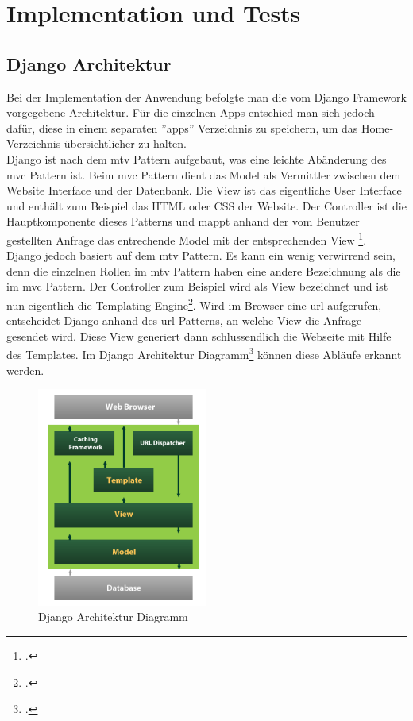 \section{Implementation und Tests}
\subsection{Django Architektur}
Bei der Implementation der Anwendung befolgte man die vom Django Framework vorgegebene Architektur. Für die einzelnen Apps entschied man sich jedoch dafür, diese in einem separaten ''apps'' Verzeichnis zu speichern, um das Home-Verzeichnis übersichtlicher zu halten.\\

Django ist nach dem \gls{mtv} Pattern aufgebaut, was eine leichte Abänderung des \gls{mvc} Pattern ist. Beim \gls{mvc} Pattern dient das Model als Vermittler zwischen dem Website Interface und der Datenbank. Die View ist das eigentliche User Interface und enthält zum Beispiel das HTML oder CSS der Website. Der Controller ist die Hauptkomponente dieses Patterns und mappt anhand der vom Benutzer gestellten Anfrage das entrechende Model mit der entsprechenden View \footcite{django_mvc}. \\

Django jedoch basiert auf dem \gls{mtv} Pattern. Es kann ein wenig verwirrend sein, denn die einzelnen Rollen im \gls{mtv} Pattern haben eine andere Bezeichnung als die im \gls{mvc} Pattern. Der Controller zum Beispiel wird als View bezeichnet und ist nun eigentlich die Templating-Engine\footcite{django_architektur}. Wird im Browser eine \gls{url} aufgerufen, entscheidet Django anhand des \gls{url} Patterns, an welche View die Anfrage gesendet wird. Diese View generiert dann schlussendlich die Webseite mit Hilfe des Templates. Im Django Architektur Diagramm\footcite{django_architektur_image} können diese Abläufe erkannt werden. \\

\newpage

\begin{figure}[H]
	\begin{center}	
		\includegraphics[width=0.5\textwidth, keepaspectratio]{images/django_mtv.png}
		\caption{Django Architektur Diagramm}
			\label{django_architecture}
	\end{center}
\end{figure}

